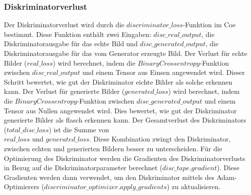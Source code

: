 \subsubsection{Diskriminatorverlust}
Der Diskriminatorverlust wird durch die $discriminator\_loss$-Funktion im Coe bestimmt. Diese Funktion enthält zwei Eingaben: $disc\_real\_output$, die Diskriminatorausgabe für das echte Bild und $disc\_generated\_output$, die Diskriminatorausgabe für das vom Generator erzeugte Bild. Der Verlust für echte Bilder ($real\_loss$) wird berechnet, indem die $BinaryCrossentropy$-Funktion zwischen $disc\_real\_output$ und einem Tensor aus Einsen angewendet wird. Dieser Schritt bewertet, wie gut der Diskriminator eichte Bilder als solche erkennen kann.
Der Verlust für generierte Bilder ($generated\_loss$) wird berechnet, indem die $BinaryCrossentropy$-Funktion zwischen $disc\_generated\_output$ und einem Tensor aus Nullen angewendet wird. Dies bewertet, wie gut der Diskriminator generierte Bilder als flasch erkennen kann.
\newline
Der Gesamtverlust des Diskriminators ($total\_disc\_loss$) ist die Summe von \\$real\_loss$ und $generated\_loss$. Diese Kombination zwingt den Diskriminator, zwischen echten und generierten Bildern besser zu unterscheiden.
\newline
Für die Optimierung des Diskriminator werden die Gradienten des Diskriminatorverlusts in Bezug auf die Diskriminatorparameter berechnet ($disc\_tape.gradient$). Diese Gradienten werden dann verwendet, um den Diskriminator mittels des Adam-Optimierers ($discriminator\_optimizer.apply\_gradients$) zu aktualisieren.



